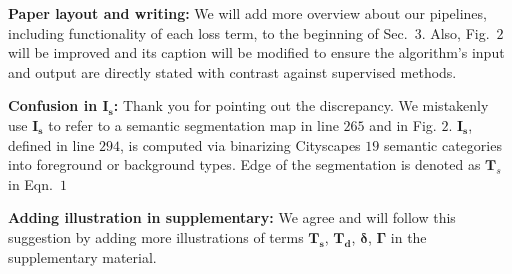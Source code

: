 \documentclass[10pt,twocolumn,letterpaper]{article}
\begin{document}
\noindent \textbf{Paper layout and writing:} 
We will add more overview about our pipelines, including functionality of each loss term, to the beginning of Sec.~$3$. 
Also, Fig.~$2$ will be improved and its caption will be modified to ensure the algorithm's input and output are directly stated with contrast against supervised methods. 

\noindent \textbf{Confusion in $\mathbf{I_s}$:} 
Thank you for pointing out the discrepancy. 
We mistakenly use $\mathbf{I_s}$ to refer to a semantic segmentation map in line $265$ and in Fig. $2$. 
$\mathbf{I_s}$, defined in line $294$, is computed via binarizing Cityscapes $19$ semantic categories into foreground or background types. Edge of the segmentation is denoted as $\mathbf{T}_s$ in Eqn.~$1$

\noindent \textbf{Adding illustration in supplementary:} 
We agree and will follow this suggestion by adding more illustrations of terms $\mathbf{T_s}$, $\mathbf{T_d}$, $\mathbf{\delta}$, $\mathbf{\Gamma}$ in the supplementary material.
\end{document}
